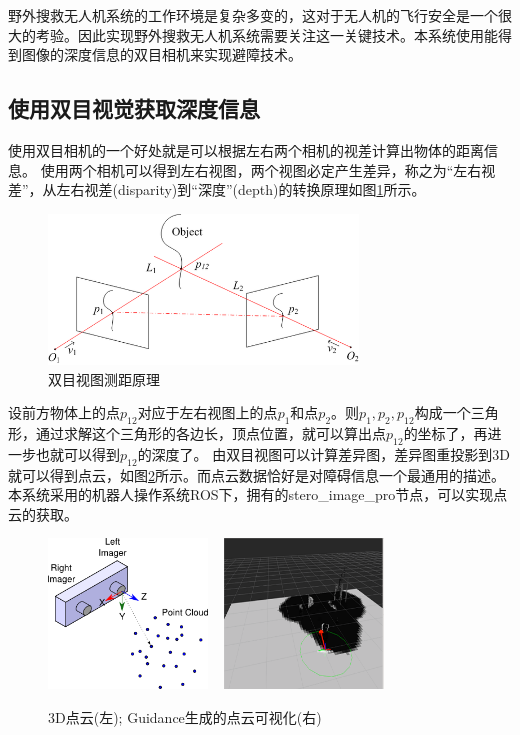 野外搜救无人机系统的工作环境是复杂多变的，这对于无人机的飞行安全是一个很大的考验。因此实现野外搜救无人机系统需要关注这一关键技术。本系统使用能得到图像的深度信息的双目相机来实现避障技术。

\subsection{使用双目视觉获取深度信息}

使用双目相机的一个好处就是可以根据左右两个相机的视差计算出物体的距离信息。
使用两个相机可以得到左右视图，两个视图必定产生差异，称之为“左右视差”，从左右视差(disparity)到“深度”(depth)的转换原理如图\ref{DoubleVision}所示。

\begin{figure}[hb]
    \centering
    \includegraphics[height=4cm]{figures/双目视图测距原理.png}
    \caption{双目视图测距原理}\label{DoubleVision}
\end{figure}


设前方物体上的点$p_{12}$对应于左右视图上的点$p_1$和点$p_2$。则$p_1,p_2,p_{12}$构成一个三角形，通过求解这个三角形的各边长，顶点位置，就可以算出点$p_{12}$的坐标了，再进一步也就可以得到$p_{12}$的深度了。
由双目视图可以计算差异图，差异图重投影到3D就可以得到点云，如图\ref{3DCloud}所示。而点云数据恰好是对障碍信息一个最通用的描述。本系统采用的机器人操作系统ROS下，拥有的stero_image_pro节点，可以实现点云的获取。
 	 
\begin{figure}[h]
    \centering
    \includegraphics[height=4cm]{figures/3D点云.png}
    ~
    \includegraphics[height=4cm]{figures/点云可视化.png}
    \caption{3D点云(左); Guidance生成的点云可视化(右)}\label{3DCloud}
\end{figure}

